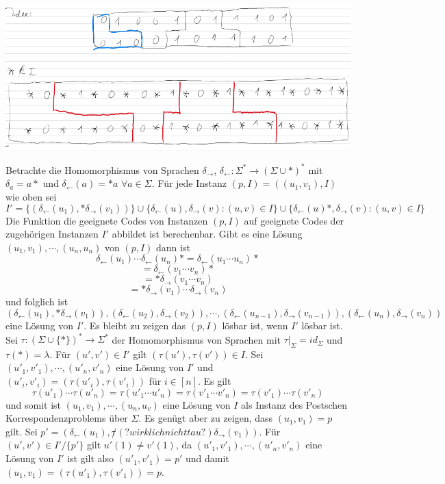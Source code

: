     \begin{center}  
      \includegraphics[scale=0.4]{Berechenbarkeit/Tetris.png}
    \end{center}
    
    Betrachte die Homomorphismus von Sprachen \(\delta_{\rightarrow}\), \(\delta_{\leftarrow} : \Sigma^* \rightarrow (\Sigma \cup {*})^*\) mit \(\delta_{a} = a*\) und \(\delta_{\leftarrow}(a) = *a\) \(\forall a \in \Sigma\). Für jede Instanz \((p, I) = ((u_1, v_1), I)\) wie oben sei 
    \[
      I' = \{(\delta_{\leftarrow}(u_1), *\delta_{\rightarrow}(v_1))\} \cup \{\delta_{\leftarrow}(u), \delta_{\rightarrow}(v):  (u, v) \in I\} \cup \{\delta_{\leftarrow}(u)*, \delta_{\rightarrow}(v): (u, v) \in I\}
    \]
      Die Funktion die geeignete Codes von Instanzen \((p, I)\) auf geeignete Codes der zugehörigen Instanzen \(I'\) abbildet ist berechenbar. Gibt es eine Lösung \((u_1, v_1), \cdots, (u_n, u_n)\) von \((p,I)\) dann ist 
    \[
      \delta_{\leftarrow}(u_1)\cdots \delta_{\leftarrow}(u_n)* = \delta_{\leftarrow} (u_1 \cdots u_n)*
    \]
    \[
      = \delta_{\leftarrow}(v_1 \cdots v_n)*
    \] 
    \[
      = *\delta_{\rightarrow}(v_1 \cdots v_n)
    \]
    \[
      =*\delta_{\rightarrow}(v_1) \cdots \delta_{\rightarrow}(v_n)
    \]
    und folglich ist 
    \[
      (\delta_{\leftarrow}(u_1), *\delta_{\rightarrow}(v_1)), (\delta_{\leftarrow}(u_2), \delta_{\rightarrow}(v_2)), \cdots, (\delta_{\leftarrow}(u_{n-1}), \delta_{\rightarrow}(v_{n-1})), (\delta_{\leftarrow}(u_{n}), \delta_{\rightarrow}(v_{n}))
    \]
    eine Lösung von \(I'\). Es bleibt zu zeigen das \((p, I)\) lösbar ist, wenn \(I'\) lösbar ist. Sei \(\tau : (\Sigma \cup \{*\})^* \rightarrow \Sigma^*\) der Homomorphismus von Sprachen mit \(\tau \vert_{\Sigma} = id_{\Sigma}\) und \(\tau(*) = \lambda\). Für \((u', v') \in I'\) gilt \((\tau (u'), \tau(v')) \in I\). Sei \((u'_1, v'_1), \cdots, (u'_n, v'_n)\) eine Lösung von \(I'\) und \((u'_i, v'_i) = (\tau(u'_i), \tau(v'_i))\) für \(i \in [n]\). Es gilt \[\tau(u'_1) \cdots \tau(u'_n) = \tau(u'_1 \cdots u'_n) = \tau(v'_1 \cdots v'_n) = \tau(v'_1) \cdots \tau(v'_n)\] und somit ist \((u_1, v_1), \cdots, (u_n, u_v)\) eine Lösung von \(I\) als Instanz des Postschen Korrespondenzproblems über \(\Sigma\). Es genügt aber zu zeigen, dass \((u_1, v_1) = p \) gilt. Sei \(p' = (\delta_{\leftarrow} (u_1), \not \tau (?wirklich nicht tau?) \delta_{\rightarrow}(v_1))\). Für \((u', v') \in I' / \{p'\}\) gilt \(u'(1) \not = v'(1)\), da \((u'_1, v'_1), \cdots, (u'_n, v'_n)\) eine Lösung von \(I'\) ist gilt also \((u'_1, v'_1) = p'\) und damit \((u_1, v_1) = (\tau(u'_1), \tau(v'_1)) = p\).

